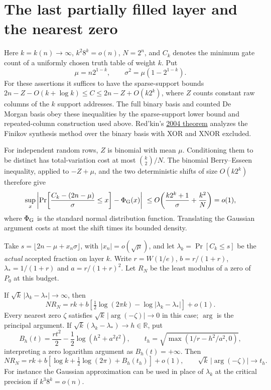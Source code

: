 \section{The last partially filled layer and the nearest zero}
Here \(k=k(n)\to\infty\), \(k^2 8^k=o(n)\), \(N=2^n\), and \(C_k\) denotes the minimum gate count of a uniformly chosen truth table of weight \(k\). Put
\[
 \mu=n2^{1-k},\qquad \sigma^2=\mu(1-2^{1-k}).
\]
For these assertions it suffices to have the sparse-support bounds \(2n-Z-O(k+\log k)\le C\le2n-Z+O(k2^k)\), where \(Z\) counts constant raw columns of the \(k\) support addresses. The full binary basis and counted De Morgan basis obey these inequalities by the sparse-support lower bound and repeated-column construction used above. Red'kin's \href{https://www.mathnet.ru/eng/dm172}{2004 theorem} analyzes the Finikov synthesis method over the binary basis with XOR and XNOR excluded.

For independent random rows, \(Z\) is binomial with mean \(\mu\). Conditioning them to be distinct has total-variation cost at most \(\binom{k}{2}/N\). The binomial Berry--Esseen inequality, applied to \(-Z+\mu\), and the two deterministic shifts of size \(O(k2^k)\) therefore give
\[
 \sup_x\left|\Pr\!\left[\frac{C_k-(2n-\mu)}{\sigma}\le x\right]
        -\Phi_{\rm G}(x)\right|
 \ \le O\!\left(\frac{k2^k+1}{\sigma}+\frac{k^2}{N}\right)=o(1),
\]
where \(\Phi_{\rm G}\) is the standard normal distribution function. Translating the Gaussian argument costs at most the shift times its bounded density.

Take \(s=\lfloor2n-\mu+x_n\sigma\rfloor\), with \(|x_n|=o(\sqrt\mu)\), and let \(\lambda_k=\Pr[C_k\le s]\) be the \emph{actual} accepted fraction on layer \(k\). Write \(r=W(1/e)\), \(b=r/(1+r)\), \(\lambda_*=1/(1+r)\) and \(a=r/(1+r)^2\). Let \(R_N\) be the least modulus of a zero of \(P_0\) at this budget.
\begin{theorem}
If \(\sqrt{k}\,|\lambda_k-\lambda_*|\to\infty\), then
\[
 NR_N=rk+b\left[\tfrac12\log(2\pi k)-\log|\lambda_k-\lambda_*|\right]+o(1).
\]
Every nearest zero \(\zeta\) satisfies \(\sqrt{k}\,|\arg(-\zeta)|\to0\) in this case; \(\arg\) is the principal argument. If \(\sqrt{k}(\lambda_k-\lambda_*)\to h\in\mathbb R\), put
\[
 B_h(t)=\frac{r t^2}{2}-\frac12\log(h^2+a^2t^2),\qquad
 t_h=\sqrt{\max(1/r-h^2/a^2,0)} ,
\]
interpreting a zero logarithm argument as \(B_h(t)=+\infty\). Then
\[
 NR_N=rk+b\left[\log k+\tfrac12\log(2\pi)
                       +B_h(t_h)\right]+o(1),\qquad
       \sqrt{k}\,|\arg(-\zeta)|\longrightarrow t_h .
\]
For instance the Gaussian approximation can be used in place of \(\lambda_k\) at the critical precision if \(k^3 8^k=o(n)\).
\end{theorem}

